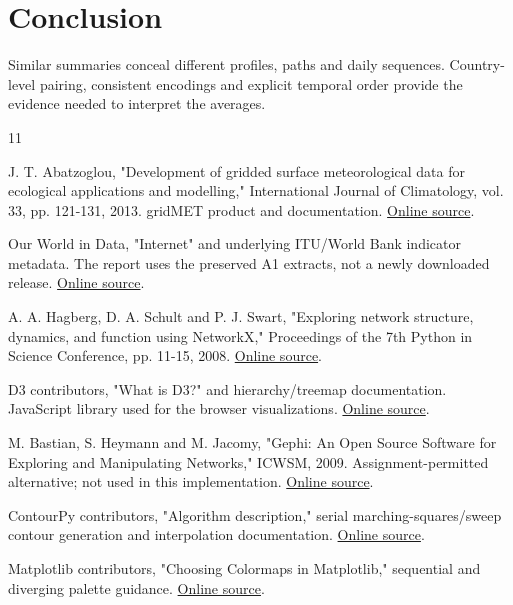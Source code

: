 \documentclass[conference,a4paper]{IEEEtran}
\begin{document}
\section{Conclusion}

Similar summaries conceal different profiles, paths and daily sequences. Country-level pairing, consistent encodings and explicit temporal order provide the evidence needed to interpret the averages.



\begin{thebibliography}{11}

 J. T. Abatzoglou, "Development of gridded surface meteorological data for ecological applications and modelling," International Journal of Climatology, vol. 33, pp. 121-131, 2013. gridMET product and documentation. \href{https://www.climatologylab.org/gridmet.html}{Online source}.

 Our World in Data, "Internet" and underlying ITU/World Bank indicator metadata. The report uses the preserved A1 extracts, not a newly downloaded release. \href{https://ourworldindata.org/internet}{Online source}.

 A. A. Hagberg, D. A. Schult and P. J. Swart, "Exploring network structure, dynamics, and function using NetworkX," Proceedings of the 7th Python in Science Conference, pp. 11-15, 2008. \href{https://aric.hagberg.org/papers/hagberg-2008-exploring.pdf}{Online source}.

 D3 contributors, "What is D3?" and hierarchy/treemap documentation. JavaScript library used for the browser visualizations. \href{https://d3js.org/what-is-d3}{Online source}.

 M. Bastian, S. Heymann and M. Jacomy, "Gephi: An Open Source Software for Exploring and Manipulating Networks," ICWSM, 2009. Assignment-permitted alternative; not used in this implementation. \href{https://doi.org/10.1609/icwsm.v3i1.13937}{Online source}.

 ContourPy contributors, "Algorithm description," serial marching-squares/sweep contour generation and interpolation documentation. \href{https://contourpy.readthedocs.io/en/stable/description.html}{Online source}.

 Matplotlib contributors, "Choosing Colormaps in Matplotlib," sequential and diverging palette guidance. \href{https://matplotlib.org/stable/users/explain/colors/colormaps.html}{Online source}.


\end{thebibliography}
\end{document}
